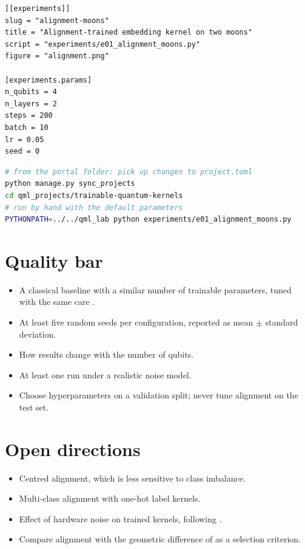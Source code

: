 \documentclass[11pt,a4paper]{article}
\begin{document}
\begin{lstlisting}[language={}]
[[experiments]]
slug = "alignment-moons"
title = "Alignment-trained embedding kernel on two moons"
script = "experiments/e01_alignment_moons.py"
figure = "alignment.png"

[experiments.params]
n_qubits = 4
n_layers = 2
steps = 200
batch = 10
lr = 0.05
seed = 0
\end{lstlisting}

\begin{lstlisting}[language=bash]
# from the portal folder: pick up changes to project.toml
python manage.py sync_projects
cd qml_projects/trainable-quantum-kernels
# run by hand with the default parameters
PYTHONPATH=../../qml_lab python experiments/e01_alignment_moons.py
\end{lstlisting}

\section{Quality bar}
\begin{itemize}
  \item A classical baseline with a similar number of trainable parameters, tuned with the same care \citep{bowles2024}.
  \item At least five random seeds per configuration, reported as mean $\pm$ standard deviation.
  \item How results change with the number of qubits.
  \item At least one run under a realistic noise model.
  \item Choose hyperparameters on a validation split; never tune alignment on the test set.
\end{itemize}

\section{Open directions}
\begin{itemize}
  \item Centred alignment, which is less sensitive to class imbalance.
  \item Multi-class alignment with one-hot label kernels.
  \item Effect of hardware noise on trained kernels, following \citet{hubregtsen2022}.
  \item Compare alignment with the geometric difference of \citet{huang2021power} as a selection criterion.
\end{itemize}
\end{document}
